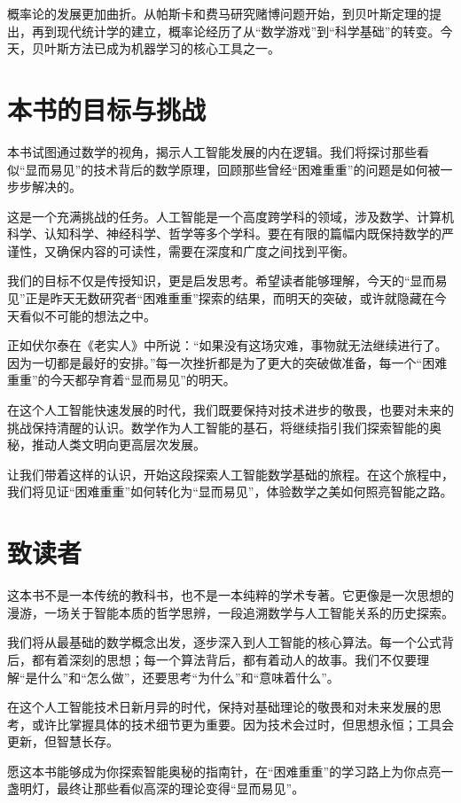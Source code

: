 概率论的发展更加曲折。从帕斯卡和费马研究赌博问题开始，到贝叶斯定理的提出，再到现代统计学的建立，概率论经历了从“数学游戏”到“科学基础”的转变。今天，贝叶斯方法已成为机器学习的核心工具之一。

\section{本书的目标与挑战}

本书试图通过数学的视角，揭示人工智能发展的内在逻辑。我们将探讨那些看似“显而易见”的技术背后的数学原理，回顾那些曾经“困难重重”的问题是如何被一步步解决的。

这是一个充满挑战的任务。人工智能是一个高度跨学科的领域，涉及数学、计算机科学、认知科学、神经科学、哲学等多个学科。要在有限的篇幅内既保持数学的严谨性，又确保内容的可读性，需要在深度和广度之间找到平衡。

我们的目标不仅是传授知识，更是启发思考。希望读者能够理解，今天的“显而易见”正是昨天无数研究者“困难重重”探索的结果，而明天的突破，或许就隐藏在今天看似不可能的想法之中。

正如伏尔泰在《老实人》中所说：“如果没有这场灾难，事物就无法继续进行了。因为一切都是最好的安排。”每一次挫折都是为了更大的突破做准备，每一个“困难重重”的今天都孕育着“显而易见”的明天。

在这个人工智能快速发展的时代，我们既要保持对技术进步的敬畏，也要对未来的挑战保持清醒的认识。数学作为人工智能的基石，将继续指引我们探索智能的奥秘，推动人类文明向更高层次发展。

让我们带着这样的认识，开始这段探索人工智能数学基础的旅程。在这个旅程中，我们将见证“困难重重”如何转化为“显而易见”，体验数学之美如何照亮智能之路。

\section{致读者}

这本书不是一本传统的教科书，也不是一本纯粹的学术专著。它更像是一次思想的漫游，一场关于智能本质的哲学思辨，一段追溯数学与人工智能关系的历史探索。

我们将从最基础的数学概念出发，逐步深入到人工智能的核心算法。每一个公式背后，都有着深刻的思想；每一个算法背后，都有着动人的故事。我们不仅要理解“是什么”和“怎么做”，还要思考“为什么”和“意味着什么”。

在这个人工智能技术日新月异的时代，保持对基础理论的敬畏和对未来发展的思考，或许比掌握具体的技术细节更为重要。因为技术会过时，但思想永恒；工具会更新，但智慧长存。

愿这本书能够成为你探索智能奥秘的指南针，在“困难重重”的学习路上为你点亮一盏明灯，最终让那些看似高深的理论变得“显而易见”。


\newpage